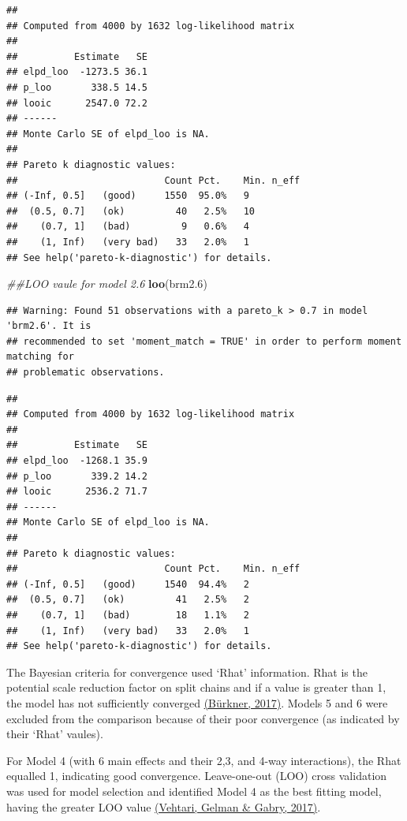 \documentclass[
]{article}
\newenvironment{Shaded}{\begin{snugshade}}{\end{snugshade}}
\newcommand{\CommentTok}[1]{\textcolor[rgb]{0.56,0.35,0.01}{\textit{#1}}}
\newcommand{\FloatTok}[1]{\textcolor[rgb]{0.00,0.00,0.81}{#1}}
\newcommand{\KeywordTok}[1]{\textcolor[rgb]{0.13,0.29,0.53}{\textbf{#1}}}
\newcommand{\NormalTok}[1]{#1}
\begin{document}
\begin{verbatim}
## 
## Computed from 4000 by 1632 log-likelihood matrix
## 
##          Estimate   SE
## elpd_loo  -1273.5 36.1
## p_loo       338.5 14.5
## looic      2547.0 72.2
## ------
## Monte Carlo SE of elpd_loo is NA.
## 
## Pareto k diagnostic values:
##                          Count Pct.    Min. n_eff
## (-Inf, 0.5]   (good)     1550  95.0%   9         
##  (0.5, 0.7]   (ok)         40   2.5%   10        
##    (0.7, 1]   (bad)         9   0.6%   4         
##    (1, Inf)   (very bad)   33   2.0%   1         
## See help('pareto-k-diagnostic') for details.
\end{verbatim}

\begin{Shaded}
\begin{Highlighting}[]
\CommentTok{##LOO vaule for model 2.6}
\KeywordTok{loo}\NormalTok{(brm2}\FloatTok{.6}\NormalTok{)}
\end{Highlighting}
\end{Shaded}

\begin{verbatim}
## Warning: Found 51 observations with a pareto_k > 0.7 in model 'brm2.6'. It is
## recommended to set 'moment_match = TRUE' in order to perform moment matching for
## problematic observations.
\end{verbatim}

\begin{verbatim}
## 
## Computed from 4000 by 1632 log-likelihood matrix
## 
##          Estimate   SE
## elpd_loo  -1268.1 35.9
## p_loo       339.2 14.2
## looic      2536.2 71.7
## ------
## Monte Carlo SE of elpd_loo is NA.
## 
## Pareto k diagnostic values:
##                          Count Pct.    Min. n_eff
## (-Inf, 0.5]   (good)     1540  94.4%   2         
##  (0.5, 0.7]   (ok)         41   2.5%   2         
##    (0.7, 1]   (bad)        18   1.1%   2         
##    (1, Inf)   (very bad)   33   2.0%   1         
## See help('pareto-k-diagnostic') for details.
\end{verbatim}

The Bayesian criteria for convergence used `Rhat' information. Rhat is
the potential scale reduction factor on split chains and if a value is
greater than 1, the model has not sufficiently converged
\href{https://arxiv.org/abs/1705.11123}{(Bürkner, 2017)}. Models 5 and 6
were excluded from the comparison because of their poor convergence (as
indicated by their `Rhat' vaules).

For Model 4 (with 6 main effects and their 2,3, and 4-way interactions),
the Rhat equalled 1, indicating good convergence. Leave-one-out (LOO)
cross validation was used for model selection and identified Model 4 as
the best fitting model, having the greater LOO value
\href{https://link.springer.com/article/10.1007/s11222-016-9696-4}{(Vehtari,
Gelman \& Gabry, 2017)}.
\end{document}
